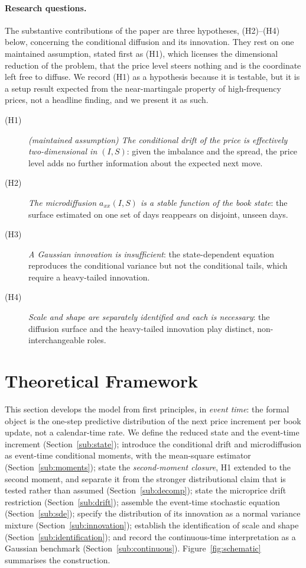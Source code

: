 \documentclass[11pt]{article}
\theoremstyle{plain}
\theoremstyle{definition}
\newcommand{\axx}{a_{xx}}
\begin{document}
\paragraph{Research questions.}
The substantive contributions of the paper are three hypotheses, (H2)--(H4) below,
concerning the conditional diffusion and its innovation. They rest on one maintained
assumption, stated first as (H1), which licenses the dimensional reduction of the
problem, that the price level steers nothing and is the coordinate left free to diffuse.
We record (H1) as a hypothesis because it is testable, but it is a setup result expected
from the near-martingale property of high-frequency prices, not a headline finding, and
we present it as such.
\begin{description}
  \item[\textnormal{(H1)}] \emph{(maintained assumption) The conditional drift of the
  price is effectively two-dimensional in $(I,S)$}: given the imbalance and the spread, the
  price level adds no further information about the expected next move.
  \item[\textnormal{(H2)}] \emph{The microdiffusion $\axx(I,S)$ is a
  stable function of the book state}: the surface estimated on one set of days
  reappears on disjoint, unseen days.
  \item[\textnormal{(H3)}] \emph{A Gaussian innovation is insufficient}: the
  state-dependent equation reproduces the conditional variance but not the
  conditional tails, which require a heavy-tailed innovation.
  \item[\textnormal{(H4)}] \emph{Scale and shape are separately identified and each
  is necessary}: the diffusion surface and the heavy-tailed innovation play distinct,
  non-interchangeable roles.
\end{description}

\section{Theoretical Framework}
\label{sec:framework}

This section develops the model from first principles, in \emph{event time}: the
formal object is the one-step predictive distribution of the next price increment per
book update, not a calendar-time rate. We define the reduced state and the event-time
increment (Section~\ref{sub:state}); introduce the conditional drift and microdiffusion
as event-time conditional moments, with the mean-square estimator
(Section~\ref{sub:moments}); state the \emph{second-moment closure}, H1 extended to the
second moment, and separate it from the stronger distributional claim that is tested
rather than assumed (Section~\ref{sub:decomp}); state the microprice drift restriction
(Section~\ref{sub:drift}); assemble the event-time stochastic equation
(Section~\ref{sub:sde}); specify the distribution of its innovation as a normal variance
mixture (Section~\ref{sub:innovation}); establish the identification of scale and shape
(Section~\ref{sub:identification}); and record the continuous-time interpretation as a
Gaussian benchmark (Section~\ref{sub:continuous}). Figure~\ref{fig:schematic} summarises
the construction.
\end{document}
